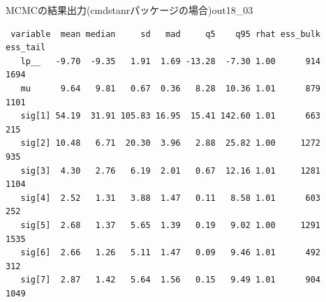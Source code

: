 \begin{SCcmd}{MCMCの結果出力(cmdstanrパッケージの場合)}{out18_03}
	\begin{verbatim}
 variable  mean median     sd   mad     q5    q95 rhat ess_bulk ess_tail
   lp__   -9.70  -9.35   1.91  1.69 -13.28  -7.30 1.00      914     1694
   mu      9.64   9.81   0.67  0.36   8.28  10.36 1.01      879     1101
   sig[1] 54.19  31.91 105.83 16.95  15.41 142.60 1.01      663      215
   sig[2] 10.48   6.71  20.30  3.96   2.88  25.82 1.00     1272      935
   sig[3]  4.30   2.76   6.19  2.01   0.67  12.16 1.01     1281     1104
   sig[4]  2.52   1.31   3.88  1.47   0.11   8.58 1.01      603      252
   sig[5]  2.68   1.37   5.65  1.39   0.19   9.02 1.00     1291     1535
   sig[6]  2.66   1.26   5.11  1.47   0.09   9.46 1.01      492      312
   sig[7]  2.87   1.42   5.64  1.56   0.15   9.49 1.01      904     1049
    \end{verbatim}
\end{SCcmd}
